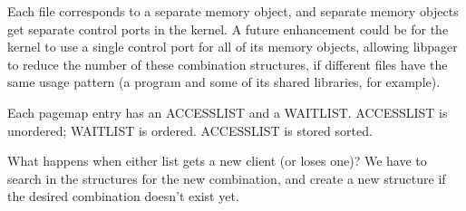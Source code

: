 \documentclass{article}
\begin{document}
Each file corresponds to a separate memory object, and separate memory
objects get separate control ports in the kernel.  A future
enhancement could be for the kernel to use a single control port for
all of its memory objects, allowing libpager to reduce the number of
these combination structures, if different files have the same usage
pattern (a program and some of its shared libraries, for example).

Each pagemap entry has an ACCESSLIST and a WAITLIST.  ACCESSLIST is
unordered; WAITLIST is ordered.  ACCESSLIST is stored sorted.

What happens when either list gets a new client (or loses one)?  We
have to search in the structures for the new combination, and create a
new structure if the desired combination doesn't exist yet.

\begin{comment}

We currently use a C++ std::set and let it do the searching for us.

Other possibilities:

  How can we organize the structures?  First, by the number of clients
  on each list.  We'll always know how many clients are in the
  ACCESSLIST we're searching for, so if we've got six ACCESSLIST clients
  and are moving the only client on WAITLIST to ACCESSLIST, we'll search
  in the seven-client ACCESSLIST, zero-client WAITLIST tables.  We can
  use a hash table or a tree.

  Because ACCESSLIST is sorted, we can binary search to find an
  ACCESSLIST that matches the one we want, then linear search forward
  and backward to find the one we want.

  or... Keep ACCESSLIST and WAITLIST completely separate for each other.
  Each pagemap entry has an ACCESSLIST pointer and a WAITLIST pointer,
  as well as some flags, including WRITE-ACCESS, which indicates if
  we've given out write access to a single client, in which case
  ACCESSLIST isn't a pointer, but a single client port number.  If
  WRITE-ACCESS is false, then ACCESSLIST points to a NULL-terminated
  list of client port numbers.  The disadvantage here is that the
  pagemap entries require more space (at least two pointers).

  WAITLISTs are ordered and include a flag for each client indicating
  whether it's waiting for READ access or WRITE access.  A special case,
  indicated by a flag, could be a single client on a WAITLIST, in which
  case we don't need a pointer to a WAITLIST, but rather can use the
  port number instead of the pointer.


\end{comment}
\end{document}
